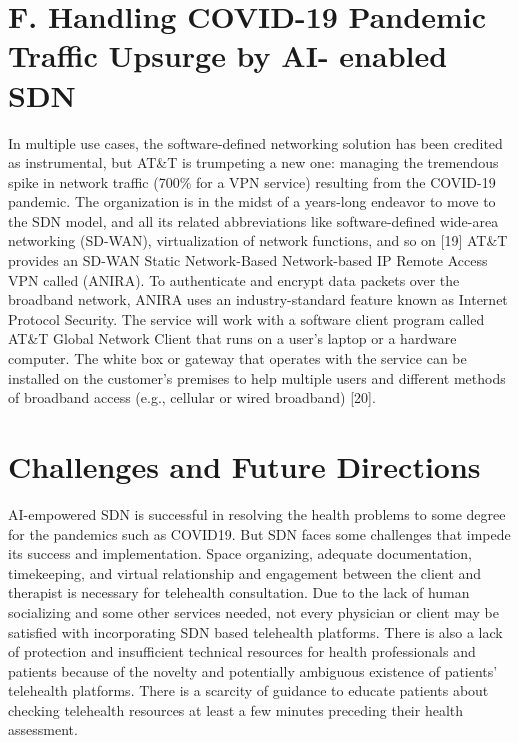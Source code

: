 \documentclass[10pt]{article}
\begin{document}
\section{F. Handling COVID-19 Pandemic Traffic Upsurge by AI- enabled SDN}
In multiple use cases, the software-defined networking solution has been credited as instrumental, but AT\&T is trumpeting a new one: managing the tremendous spike in network traffic (700\% for a VPN service) resulting from the COVID-19 pandemic. The organization is in the midst of a years-long endeavor to move to the SDN model, and all its related abbreviations like software-defined wide-area networking (SD-WAN), virtualization of network functions, and so on [19] AT\&T provides an SD-WAN Static Network-Based Network-based IP Remote Access VPN called (ANIRA). To authenticate and encrypt data packets over the broadband network, ANIRA uses an industry-standard feature known as Internet Protocol Security. The service will work with a software client program called AT\&T Global Network Client that runs on a user's laptop or a hardware computer. The white box or gateway that operates with the service can be installed on the customer's premises to help multiple users and different methods of broadband access (e.g., cellular or wired broadband) [20].

\section{Challenges and Future Directions}
AI-empowered SDN is successful in resolving the health problems to some degree for the pandemics such as COVID19. But SDN faces some challenges that impede its success and implementation. Space organizing, adequate documentation, timekeeping, and virtual relationship and engagement between the client and therapist is necessary for telehealth consultation. Due to the lack of human socializing and some other services needed, not every physician or client may be satisfied with incorporating SDN based telehealth platforms.
There is also a lack of protection and insufficient technical resources for health professionals and patients because of the novelty and potentially ambiguous existence of patients' telehealth platforms. There is a scarcity of guidance to educate patients about checking telehealth resources at least a few minutes preceding their health assessment.
\end{document}
